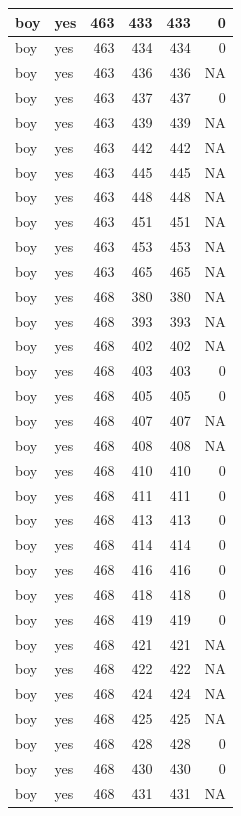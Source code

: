\documentclass[man]{apa6}
\begin{document}
\begin{tabular}{l|l|r|r|r|r}
\hline
boy & yes & 463 & 433 & 433 & 0\\
\hline
boy & yes & 463 & 434 & 434 & 0\\
\hline
boy & yes & 463 & 436 & 436 & NA\\
\hline
boy & yes & 463 & 437 & 437 & 0\\
\hline
boy & yes & 463 & 439 & 439 & NA\\
\hline
boy & yes & 463 & 442 & 442 & NA\\
\hline
boy & yes & 463 & 445 & 445 & NA\\
\hline
boy & yes & 463 & 448 & 448 & NA\\
\hline
boy & yes & 463 & 451 & 451 & NA\\
\hline
boy & yes & 463 & 453 & 453 & NA\\
\hline
boy & yes & 463 & 465 & 465 & NA\\
\hline
boy & yes & 468 & 380 & 380 & NA\\
\hline
boy & yes & 468 & 393 & 393 & NA\\
\hline
boy & yes & 468 & 402 & 402 & NA\\
\hline
boy & yes & 468 & 403 & 403 & 0\\
\hline
boy & yes & 468 & 405 & 405 & 0\\
\hline
boy & yes & 468 & 407 & 407 & NA\\
\hline
boy & yes & 468 & 408 & 408 & NA\\
\hline
boy & yes & 468 & 410 & 410 & 0\\
\hline
boy & yes & 468 & 411 & 411 & 0\\
\hline
boy & yes & 468 & 413 & 413 & 0\\
\hline
boy & yes & 468 & 414 & 414 & 0\\
\hline
boy & yes & 468 & 416 & 416 & 0\\
\hline
boy & yes & 468 & 418 & 418 & 0\\
\hline
boy & yes & 468 & 419 & 419 & 0\\
\hline
boy & yes & 468 & 421 & 421 & NA\\
\hline
boy & yes & 468 & 422 & 422 & NA\\
\hline
boy & yes & 468 & 424 & 424 & NA\\
\hline
boy & yes & 468 & 425 & 425 & NA\\
\hline
boy & yes & 468 & 428 & 428 & 0\\
\hline
boy & yes & 468 & 430 & 430 & 0\\
\hline
boy & yes & 468 & 431 & 431 & NA\\

\end{tabular}
\end{document}
